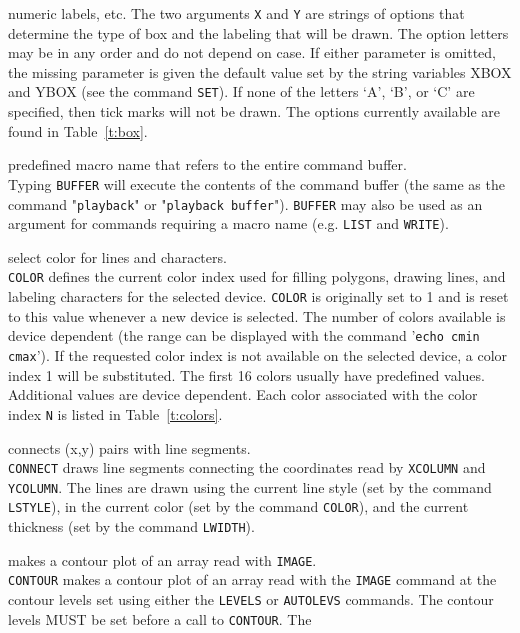 	numeric labels, etc.  The two arguments {\tt X} and
	{\tt Y} are strings of options that determine the type
	of box and the labeling that will be drawn.  The option letters
	may be in any order and do not depend on case.  If either
	parameter is omitted, the missing parameter is given the
	default value set by the string variables XBOX and YBOX (see
	the command {\tt SET}).  If none of the
	letters `A', `B', or `C' are specified, then tick marks will
	not be drawn.  The options currently available
	are found in Table~\ref{t:box}.
\item [{\tt BUFFER } --] predefined macro name that refers to the entire command buffer.\\
	Typing {\tt BUFFER} will execute the contents of the
	command buffer (the same as the command
	"{\tt playback}" or
	"{\tt playback buffer}").
	{\tt BUFFER} may also be used as an argument for commands
	requiring a macro name (e.g.  {\tt LIST}
	and {\tt WRITE}).
\item [{\tt COLOR N } --] select color for lines and characters.\\
	{\tt COLOR} defines the current color index used for
	filling polygons, drawing lines, and labeling characters for
	the selected device.  {\tt COLOR} is originally set to 1
	and is reset to this value whenever a new device is selected.
	The number of colors available is device dependent (the range
	can be displayed with the command
	'{\tt echo cmin cmax}').  If the
	requested color index is not available on the selected device,
	a color index 1 will be substituted.  The first 16 colors
	usually have predefined values.  Additional values are device
	dependent.  Each color associated with the color index
	{\tt N} is listed in
	Table~\ref{t:colors}.
\item [{\tt CONNECT } --] connects (x,y) pairs with line segments.\\
	{\tt CONNECT} draws line segments connecting the
	coordinates read by {\tt XCOLUMN}
	and {\tt YCOLUMN}.  The lines are
	drawn using the current line style (set by the command
	{\tt LSTYLE}), in the current color
	(set by the command {\tt COLOR}), and
	the current thickness (set by the command
	{\tt LWIDTH}).
\item [{\tt CONTOUR [N [BLANK [MIN]]] } --] makes a contour plot of an array read with {\tt IMAGE}.\\
	{\tt CONTOUR} makes a contour plot of an array read with
	the {\tt IMAGE} command at the
	contour levels set using either the
	{\tt LEVELS} or
	{\tt AUTOLEVS} commands.  The contour
	levels MUST be set before a call to {\tt CONTOUR}.  The
